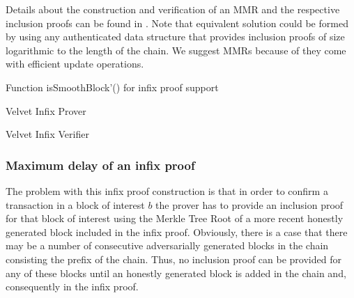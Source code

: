 Details about the construction and verification of an MMR and the respective inclusion proofs can be found in \cite{ct}.
Note that equivalent solution could be formed by using any authenticated data structure that provides inclusion proofs of size logarithmic to the length of the chain. We suggest MMRs because of they come with efficient update operations.

\begin{algorithm}[h]
	\caption{\label{alg:isSmoothBlock_infix}Function isSmoothBlock'() for infix proof support}
	\begin{algorithmic}[1]
					\State\Return{$\true$}
				\EndIf
							\State\Return{$\false$}
						\EndIf
				\EndFor
				\State{}
			\EndFunction
	\end{algorithmic}
\end{algorithm}

\begin{algorithm}[h]
	\caption{\label{alg:velvet_infix_prover}Velvet Infix Prover}
	\begin{algorithmic}[1]
				\State{}
			\EndFunction
	\end{algorithmic}
\end{algorithm}

\begin{algorithm}[h]
	\caption{\label{alg:velvet_infix_verifier}Velvet Infix Verifier}
	\begin{algorithmic}[1]
				\State{}
			\EndFunction
	\end{algorithmic}
\end{algorithm}




\subsubsection*{Maximum delay of an infix proof}
The problem with this infix proof construction is that in order to confirm a
transaction in a block of interest $b$ the prover has to provide an inclusion
proof for that block of interest using the Merkle Tree Root of a more recent
honestly generated block included in the infix proof. Obviously, there is a case
that there may be a number of consecutive adversarially generated blocks in the
chain   consisting the prefix of the chain. Thus, no inclusion proof can be provided
for any of these blocks until an honestly generated block is added in the chain and,
consequently in the infix proof.

